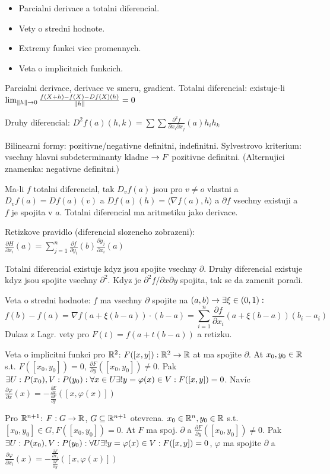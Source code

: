\begin{itemize}
\item Parcialni derivace a totalni diferencial.
\item Vety o stredni hodnote.
\item Extremy funkci vice promennych.
\item Veta o implicitnich funkcich.
\end{itemize}

Parcialni derivace, derivace ve smeru, gradient.
Totalni diferencial: existuje-li $\lim_{\|h\|\rightarrow 0}
\frac{f(X+h)-f(X)-Df(X)(h)}{\|h\|}=0$

Druhy diferencial: $D^2 f(a)(h,k)=\sum\sum\frac{\partial^2 f}{\partial
x_i\partial x_j}(a)h_i h_k$

Bilinearni formy: pozitivne/negativne definitni, indefinitni.
Sylvestrovo kriterium: vsechny hlavni subdeterminanty kladne $\rightarrow F$ pozitivne
definitni. (Alternujici znamenka: negativne definitni.)

Ma-li $f$ totalni diferencial, tak $D_v f(a)$ jsou pro $v\neq o$ vlastni a $D_v
f(a)=Df(a)(v)$ a $Df(a)(h)=\langle\nabla f(a),h\rangle$ a $\partial f$ vsechny
existuji a $f$ je spojita v $a$. Totalni diferencial ma aritmetiku jako
derivace.

Retizkove pravidlo (diferencial slozeneho zobrazeni): $\frac{\partial
H}{\partial x_i}(a)=\sum_{j=1}^n \frac{\partial f}{\partial y_i}(b)
\frac{\partial g_j}{\partial x_i}(a)$

Totalni diferencial existuje kdyz jsou spojite vsechny $\partial$.
Druhy diferencial existuje kdyz jsou spojite vsechny $\partial^2$.
Kdyz je $\partial^2 f/\partial x\partial y$ spojita, tak se da zamenit poradi.

Veta o stredni hodnote:
$f$ ma vsechny $\partial$ spojite na $(a,b)\rightarrow\exists\xi\in(0,1):$
$$f(b)-f(a)=\nabla f(a+\xi(b-a))\cdot (b-a)=\sum_{i=1}^n \frac{\partial
f}{\partial x_i}(a+\xi(b-a))(b_i-a_i)$$
Dukaz z Lagr. vety pro $F(t)=f(a+t(b-a))$ a retizku.

Veta o implicitni funkci pro $\mathbb{R}^2$:
$F([x,y]):\mathbb{R}^2\rightarrow\mathbb{R}$ at ma spojite $\partial$. At $x_0,y_0\in\mathbb{R}$ s.t.
$F([x_0,y_0])=0$, $\frac{\partial F}{\partial y}([x_0,y_0])\neq 0$.
Pak $\exists U:P(x_0),V:P(y_0):\forall x\in U \exists! y=\varphi(x)\in V: F([x,y])=0$.
Navíc $\frac{\partial\varphi}{\partial x}(x)=-\frac{\frac{\partial F}{\partial
x}}{\frac{\partial F}{\partial y}}([x,\varphi(x)])$

Pro $\mathbb{R}^{n+1}$:
$F:G\rightarrow\mathbb{R}$, $G\subseteq\mathbb{R}^{n+1}$ otevrena. $x_0\in\mathbb{R}^n,y_0\in\mathbb{R}$ s.t.
$[x_0,y_0]\in G, F([x_0,y_0])=0$. At $F$ ma spoj. $\partial$ a $\frac{\partial
F}{\partial y}([x_0,y_0])\neq 0$. Pak $\exists U:P(x_0),V:P(y_0):\forall U\exists!
y=\varphi(x)\in V:F([x,y])=0$, $\varphi$ ma spojite $\partial$ a
$\frac{\partial\varphi}{\partial x_i}(x)=-\frac{\frac{\partial F}{\partial
x_i}}{\frac{\partial F}{\partial y}}([x,\varphi(x)])$

